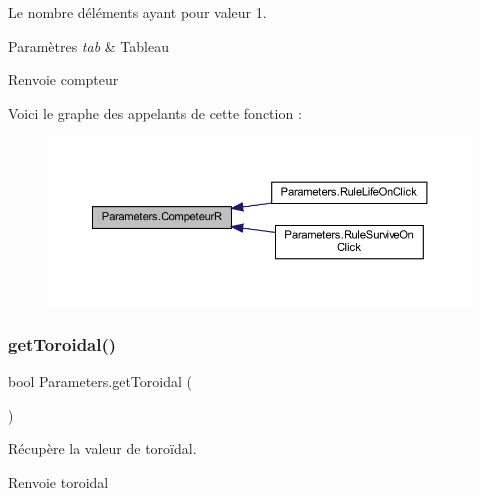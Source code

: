 Le nombre d\textquotesingle{}éléments ayant pour valeur 1. 


\begin{DoxyParams}{Paramètres}
{\em tab} & Tableau\\
\hline
\end{DoxyParams}
\begin{DoxyReturn}{Renvoie}
compteur
\end{DoxyReturn}
Voici le graphe des appelants de cette fonction \+:
\nopagebreak
\begin{figure}[H]
\begin{center}
\leavevmode
\includegraphics[width=350pt]{class_parameters_a9eb50f6a67cb480f303e5d6f91997f7d_icgraph}
\end{center}
\end{figure}
\mbox{\label{class_parameters_aa6714e2b56d3511340476f682a51e677}} 
\subsubsection{\texorpdfstring{get\+Toroidal()}{getToroidal()}}
{\footnotesize\ttfamily bool Parameters.\+get\+Toroidal (\begin{DoxyParamCaption}{ }\end{DoxyParamCaption})\hspace{0.3cm}{\ttfamily [inline]}}



Récupère la valeur de toroïdal. 

\begin{DoxyReturn}{Renvoie}
toroidal
\end{DoxyReturn}
\mbox{\label{class_parameters_a5e16007361a29535bbad70f4f0a466bc}} 
